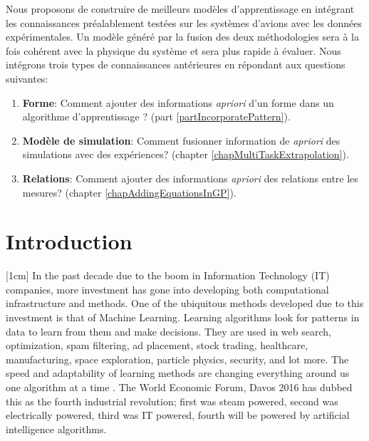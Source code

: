 \begin{mdframed}[hidealllines=true,backgroundcolor=lightgray!20]
Nous proposons de construire de meilleurs modèles d'apprentissage en intégrant les connaissances préalablement testées sur les systèmes d'avions avec les données expérimentales. Un modèle généré par la fusion des deux méthodologies sera à la fois cohérent avec la physique du système et sera plus rapide à évaluer. Nous intégrons trois types de connaissances antérieures en répondant aux questions suivantes:

\begin{enumerate}
\item \textbf{Forme}: Comment ajouter des informations \textit{apriori} d'un forme dans un algorithme d'apprentissage ? (part \ref{partIncorporatePattern}).
\item \textbf{Modèle de simulation}: Comment fusionner information de \textit{apriori} des simulations avec des expériences? (chapter \ref{chapMultiTaskExtrapolation}). 
\item \textbf{Relations}: Comment ajouter des informations \textit{apriori} des relations entre les mesures? (chapter \ref{chapAddingEquationsInGP}).
\end{enumerate}

\end{mdframed}



\section{Introduction}
[1cm]
In the past decade due to the boom in Information Technology (IT) companies, more investment has gone into developing both computational infrastructure and methods. One of the ubiquitous methods developed due to this investment is that of Machine Learning. Learning algorithms look for patterns in data to learn from them and make decisions. They are used in web search, optimization, spam filtering, ad placement, stock trading, healthcare, manufacturing, space exploration, particle physics, security, and lot more. The speed and adaptability of learning methods are changing everything around us one algorithm at a time \cite{domingos2015master}. The World Economic Forum, Davos 2016 \cite{schwab2016fourth} has dubbed this as the fourth industrial revolution; first was steam powered, second was electrically powered, third was IT powered, fourth will be powered by artificial intelligence algorithms.

